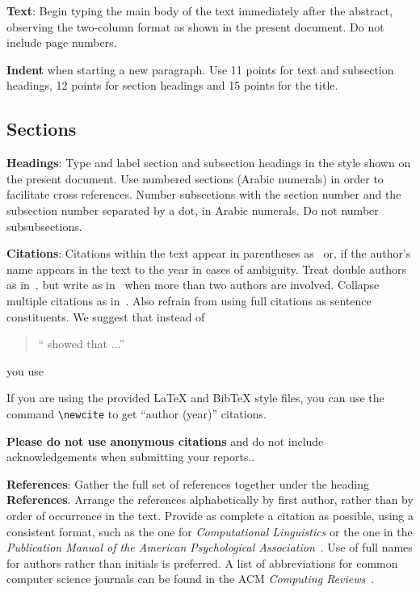 \documentclass[11pt]{article}
\begin{document}
{\bf Text}: Begin typing the main body of the text immediately after
the abstract, observing the two-column format as shown in 
the present document. Do not include page numbers.

{\bf Indent} when starting a new paragraph. Use 11 points for text and 
subsection headings, 12 points for section headings and 15 points for
the title. 

\subsection{Sections}

{\bf Headings}: Type and label section and subsection headings in the
style shown on the present document.  Use numbered sections (Arabic
numerals) in order to facilitate cross references. Number subsections
with the section number and the subsection number separated by a dot,
in Arabic numerals. Do not number subsubsections.

{\bf Citations}: Citations within the text appear in parentheses
as~\cite{Gusfield:97} or, if the author's name appears in the text
to the year in cases of ambiguity.  Treat double authors as
in~\cite{Aho:72}, but write as in~\cite{Chandra:81} when more than two
authors are involved. Collapse multiple citations as
in~\cite{Gusfield:97,Aho:72}. Also refrain from using full citations
as sentence constituents. We suggest that instead of
\begin{quote}
  ``\cite{Gusfield:97} showed that ...''
\end{quote}
you use
\begin{quote}
\end{quote}

If you are using the provided \LaTeX{} and Bib\TeX{} style files, you
can use the command \verb|\newcite| to get ``author (year)'' citations.

\textbf{Please do not use anonymous citations} and do not include
acknowledgements when submitting your reports..

\textbf{References}: Gather the full set of references together under
the heading {\bf References}. Arrange the references alphabetically
by first author, rather than by order of occurrence in the text.
Provide as complete a citation as possible, using a consistent format,
such as the one for {\em Computational Linguistics\/} or the one in the 
{\em Publication Manual of the American 
Psychological Association\/}~\cite{APA:83}.  Use of full names for
authors rather than initials is preferred.  A list of abbreviations
for common computer science journals can be found in the ACM 
{\em Computing Reviews\/}~\cite{ACM:83}.
\end{document}

